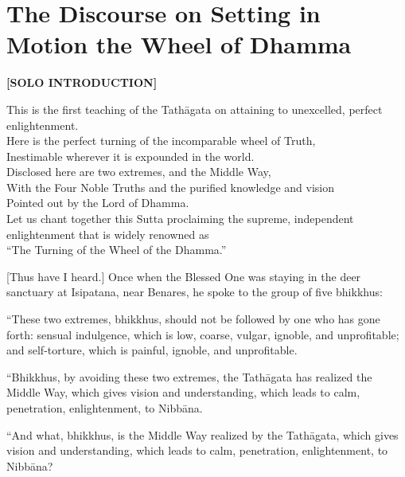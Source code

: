 \chapter[The Wheel of Dhamma]{The Discourse on Setting in Motion the Wheel of Dhamma}

\begin{leader}
{\AlegreyaSans{}\color[gray]{0.5}\textbf{[SOLO INTRODUCTION]}}

This is the first teaching of the Tathāgata on attaining to unexcelled, perfect enlightenment.\\
Here is the perfect turning of the incomparable wheel of Truth,\\
Inestimable wherever it is expounded in the world.\\
Disclosed here are two extremes, and the Middle Way,\\
With the Four Noble Truths and the purified knowledge and vision\\
Pointed out by the Lord of Dhamma.\\
Let us chant together this Sutta proclaiming the supreme, independent enlightenment that is widely renowned as\\
``The Turning of the Wheel of the Dhamma.''
\end{leader}

[Thus have I heard.] Once when the Blessed One was staying in the deer sanctuary at Isipatana, near Benares, he spoke to the group of five bhikkhus:

``These two extremes, bhikkhus, should not be followed by one who has gone forth: sensual indulgence, which is low, coarse, vulgar, ignoble, and unprofitable; and self-torture, which is painful, ignoble, and unprofitable.

``Bhikkhus, by avoiding these two extremes, the Tathāgata has realized the Middle Way, which gives vision and understanding, which leads to calm, penetration, enlightenment, to Nibbāna.

``And what, bhikkhus, is the Middle Way realized by the Tathāgata, which gives vision and understanding, which leads to calm, penetration, enlightenment, to Nibbāna?

